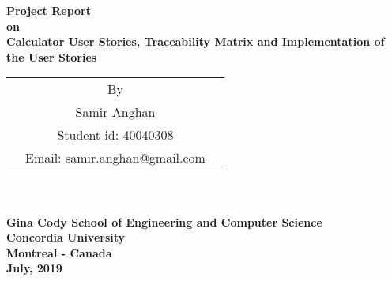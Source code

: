 \thispagestyle{empty}
\begin{center}
\Large \textbf{Project Report \\ on \\Calculator User Stories, Traceability Matrix and Implementation of the User Stories  \\}
\normalsize
\vspace{84pt}

\large
\begin{tabular}{ccc}
&By&\\
&Samir Anghan&\\
&Student id: 40040308&\\
&Email: samir.anghan@gmail.com&\\
\end{tabular}\\


\vspace{84pt}
\hspace{5cm} \makebox[6in]{\hrulefill}\\
\large
\textbf{Gina Cody School of Engineering and Computer Science}\\
\textbf{Concordia University} \\
\textbf{Montreal - Canada}\\
\vspace{24pt}
\textbf{July, 2019}
\end{center}
